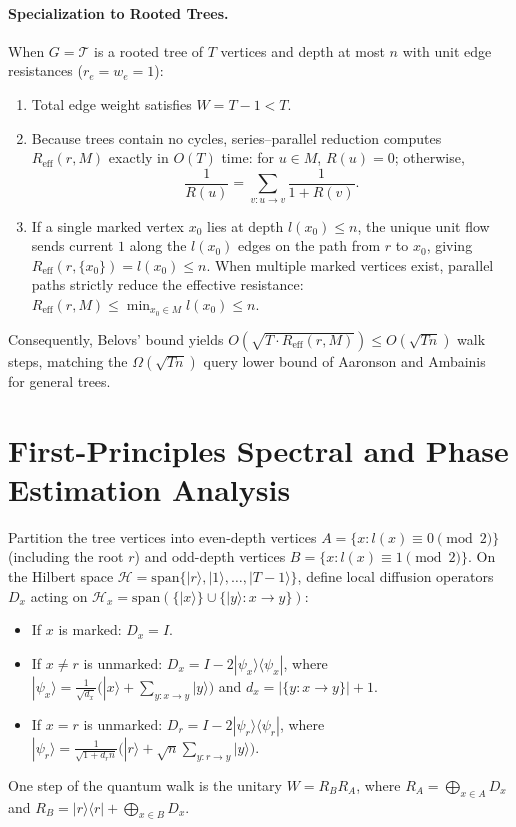 \documentclass[11pt,a4paper]{article}
\begin{document}
\paragraph{Specialization to Rooted Trees.}
When $G = \mathcal{T}$ is a rooted tree of $T$ vertices and depth at most $n$ with unit edge resistances ($r_e = w_e = 1$):
\begin{enumerate}
    \item Total edge weight satisfies $W = T - 1 < T$.
    \item Because trees contain no cycles, series--parallel reduction computes $R_{\mathrm{eff}}(r, M)$ exactly in $O(T)$ time: for $u \in M$, $R(u) = 0$; otherwise,
    \[
    \frac{1}{R(u)} = \sum_{v : u \to v} \frac{1}{1 + R(v)}.
    \]
    \item If a single marked vertex $x_0$ lies at depth $l(x_0) \le n$, the unique unit flow sends current $1$ along the $l(x_0)$ edges on the path from $r$ to $x_0$, giving $R_{\mathrm{eff}}(r, \{x_0\}) = l(x_0) \le n$. When multiple marked vertices exist, parallel paths strictly reduce the effective resistance: $R_{\mathrm{eff}}(r, M) \le \min_{x_0 \in M} l(x_0) \le n$.
\end{enumerate}
Consequently, Belovs' bound yields $O(\sqrt{T \cdot R_{\mathrm{eff}}(r, M)}) \le O(\sqrt{Tn})$ walk steps, matching the $\Omega(\sqrt{Tn})$ query lower bound of Aaronson and Ambainis~\cite{aaronson2005} for general trees.

\section{First-Principles Spectral and Phase Estimation Analysis}

Partition the tree vertices into even-depth vertices $A = \{x : l(x) \equiv 0 \pmod 2\}$ (including the root $r$) and odd-depth vertices $B = \{x : l(x) \equiv 1 \pmod 2\}$. On the Hilbert space $\mathcal{H} = \mathrm{span}\{|r\rangle, |1\rangle, \dots, |T-1\rangle\}$, define local diffusion operators $D_x$ acting on $\mathcal{H}_x = \mathrm{span}(\{|x\rangle\} \cup \{|y\rangle : x \to y\})$:
\begin{itemize}
    \item If $x$ is marked: $D_x = I$.
    \item If $x \neq r$ is unmarked: $D_x = I - 2|\psi_x\rangle\langle\psi_x|$, where $|\psi_x\rangle = \frac{1}{\sqrt{d_x}}\bigl(|x\rangle + \sum_{y : x \to y} |y\rangle\bigr)$ and $d_x = |\{y : x \to y\}| + 1$.
    \item If $x = r$ is unmarked: $D_r = I - 2|\psi_r\rangle\langle\psi_r|$, where $|\psi_r\rangle = \frac{1}{\sqrt{1 + d_r n}}\bigl(|r\rangle + \sqrt{n}\sum_{y : r \to y} |y\rangle\bigr)$.
\end{itemize}
One step of the quantum walk is the unitary $W = R_B R_A$, where $R_A = \bigoplus_{x \in A} D_x$ and $R_B = |r\rangle\langle r| + \bigoplus_{x \in B} D_x$.
\end{document}
